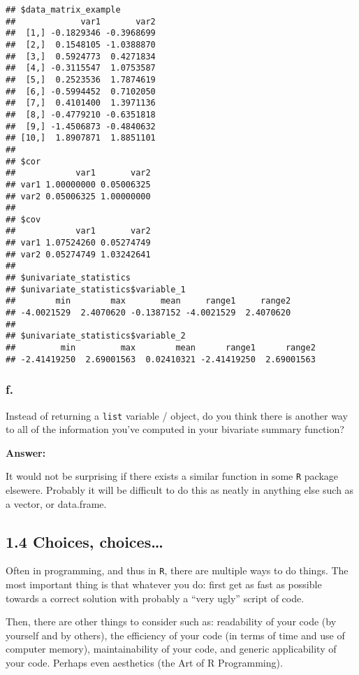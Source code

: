 \documentclass[]{article}
\begin{document}
\begin{verbatim}
## $data_matrix_example
##             var1       var2
##  [1,] -0.1829346 -0.3968699
##  [2,]  0.1548105 -1.0388870
##  [3,]  0.5924773  0.4271834
##  [4,] -0.3115547  1.0753587
##  [5,]  0.2523536  1.7874619
##  [6,] -0.5994452  0.7102050
##  [7,]  0.4101400  1.3971136
##  [8,] -0.4779210 -0.6351818
##  [9,] -1.4506873 -0.4840632
## [10,]  1.8907871  1.8851101
## 
## $cor
##            var1       var2
## var1 1.00000000 0.05006325
## var2 0.05006325 1.00000000
## 
## $cov
##            var1       var2
## var1 1.07524260 0.05274749
## var2 0.05274749 1.03242641
## 
## $univariate_statistics
## $univariate_statistics$variable_1
##        min        max       mean     range1     range2 
## -4.0021529  2.4070620 -0.1387152 -4.0021529  2.4070620 
## 
## $univariate_statistics$variable_2
##         min         max        mean      range1      range2 
## -2.41419250  2.69001563  0.02410321 -2.41419250  2.69001563
\end{verbatim}

\hypertarget{f.}{%
\subsubsection{f.}\label{f.}}

Instead of returning a \texttt{list} variable / object, do you think
there is another way to all of the information you've computed in your
bivariate summary function?

\textbf{Answer:}

It would not be surprising if there exists a similar function in some
\texttt{R} package elsewere. Probably it will be difficult to do this as
neatly in anything else such as a vector, or data.frame.

\hypertarget{choices-choices}{%
\subsection{1.4 Choices, choices\ldots{}}\label{choices-choices}}

Often in programming, and thus in \texttt{R}, there are multiple ways to
do things. The most important thing is that whatever you do: first get
as fast as possible towards a correct solution with probably a ``very
ugly'' script of code.

Then, there are other things to consider such as: readability of your
code (by yourself and by others), the efficiency of your code (in terms
of time and use of computer memory), maintainability of your code, and
generic applicability of your code. Perhaps even aesthetics (the Art of
R Programming).
\end{document}
